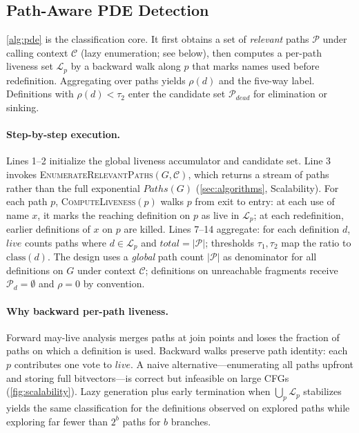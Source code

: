\documentclass[acmsmall,screen,review,anonymous]{acmart}
\begin{document}
\subsection{Path-Aware PDE Detection}
\autoref{alg:pde} is the classification core. It first obtains a set of \emph{relevant} paths $\mathcal{P}$ under calling context $\mathcal{C}$ (lazy enumeration; see below), then computes a per-path liveness set $\mathcal{L}_p$ by a backward walk along $p$ that marks names used before redefinition. Aggregating over paths yields $\rho(d)$ and the five-way label. Definitions with $\rho(d)<\tau_2$ enter the candidate set $\mathcal{P}_{dead}$ for elimination or sinking.

\paragraph{Step-by-step execution.}
Lines 1--2 initialize the global liveness accumulator and candidate set. Line 3 invokes \textsc{EnumerateRelevantPaths}$(G,\mathcal{C})$, which returns a stream of paths rather than the full exponential $\mathit{Paths}(G)$ (\autoref{sec:algorithms}, Scalability). For each path $p$, \textsc{ComputeLiveness}$(p)$ walks $p$ from exit to entry: at each use of name $x$, it marks the reaching definition on $p$ as live in $\mathcal{L}_p$; at each redefinition, earlier definitions of $x$ on $p$ are killed. Lines 7--14 aggregate: for each definition $d$, $live$ counts paths where $d\in\mathcal{L}_p$ and $total=|\mathcal{P}|$; thresholds $\tau_1,\tau_2$ map the ratio to $\mathrm{class}(d)$. The design uses a \emph{global} path count $|\mathcal{P}|$ as denominator for all definitions on $G$ under context $\mathcal{C}$; definitions on unreachable fragments receive $\mathcal{P}_d=\emptyset$ and $\rho=0$ by convention.

\paragraph{Why backward per-path liveness.}
Forward may-live analysis merges paths at join points and loses the fraction of paths on which a definition is used. Backward walks preserve path identity: each $p$ contributes one vote to $live$. A naive alternative---enumerating all paths upfront and storing full bitvectors---is correct but infeasible on large CFGs (\autoref{fig:scalability}). Lazy generation plus early termination when $\bigcup_p\mathcal{L}_p$ stabilizes yields the same classification for the definitions observed on explored paths while exploring far fewer than $2^b$ paths for $b$ branches.
\end{document}
